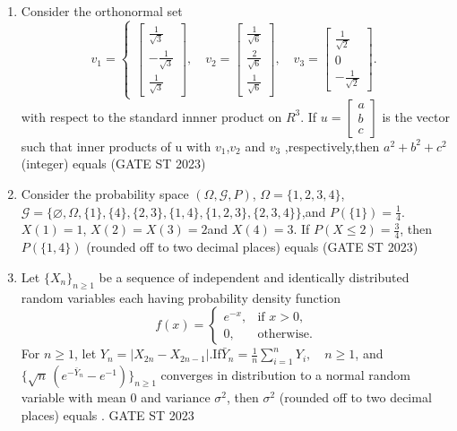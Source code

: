 \documentclass[journal]{IEEEtran}
\begin{document}
\begin{enumerate}[label=\textbf{Q.\arabic*.}, start=1, align=left, itemsep=2em]
\begin{enumerate}[label=\textbf{Q.\arabic*.}, start=11, align=left, itemsep=2em]
\item Consider the orthonormal set 
\[
v_1 = \begin{cases}
\begin{bmatrix} \frac1{\sqrt3}\\[2pt] -\frac1{\sqrt3}\\[2pt] \frac1{\sqrt3} \end{bmatrix},
\quad
v_2 = \begin{bmatrix} \frac1{\sqrt6}\\[2pt] \frac2{\sqrt6}\\[2pt] \frac1{\sqrt6} \end{bmatrix},
\quad
v_3 = \begin{bmatrix} \frac1{\sqrt2}\\[2pt] 0\\[2pt] -\frac1{\sqrt2} \end{bmatrix}.
\end{cases}
\]
with respect to the standard innner product on $R^3$.
If $u = \begin{bmatrix} a\\b\\c \end{bmatrix}$ is the vector such that inner products of u with $v_1$,$v_2$ and $v_3$ ,respectively,then $a^2 + b^2 + c^2$ (integer) equals \underline{\hspace{3cm}}\hfill(GATE ST 2023)

\item Consider the probability space $(\Omega,\mathcal{G},P)$, $\Omega = \{1,2,3,4\}$, $\mathcal{G} = \{\varnothing, \Omega, \{1\}, \{4\}, \{2,3\}, \{1,4\}, \{1,2,3\}, \{2,3,4\}\}$,and $P(\{1\}) = \frac14$.  
$X(1)=1$, $X(2)=X(3)=2$and $X(4)=3$. If $P(X \le 2) = \frac34$, then $P(\{1,4\})$ (rounded off to two decimal places) equals \underline{\hspace{3cm}}\hfill(GATE ST 2023)

\item Let $\{X_n\}_{n \ge 1}$ be a sequence of independent and identically distributed random 
variables each having probability density function  
\[
f(x) = 
\begin{cases}
e^{-x}, & \text{if } x > 0, \\
0, & \text{otherwise}.
\end{cases}
\]
For $n \ge 1$, let  
$Y_n = \left| X_{2n} - X_{2n-1} \right|$.If$\bar{Y}_n = \frac{1}{n} \sum_{i=1}^n Y_i, \quad n \ge 1$,
and $\{\sqrt{n} \, ( e^{-\bar{Y}_n} - e^{-1} )\}_{n \ge 1}$ converges in distribution to a normal random variable with mean $0$ and variance $\sigma^2$, then $\sigma^2$ (rounded off to two decimal places) equals \underline{\hspace{2cm}}.
\hspace*{15.7cm}GATE ST 2023


\end{enumerate}
\end{enumerate}
\end{document}
